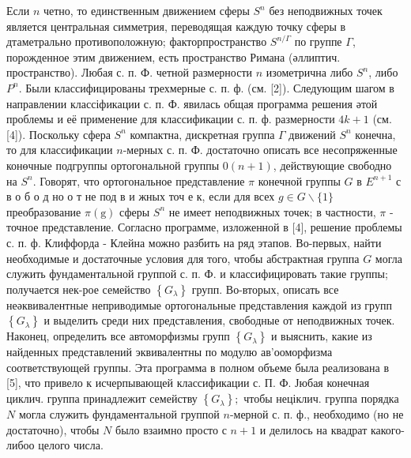 \documentclass[10pt]{article}
\begin{document}
Если $n$ четно, то единственным движением сферы $S^{n}$ без неподвижных точек является центральная симметрия, переводящая каждую точку сферы в дтаметрально противоположную; факторпространство $S^{n / \Gamma}$ по группе $\Gamma$, порожденное этим движением, есть пространство Римана (әллиптич. пространство). Любая с. п. Ф. четной размерности $n$ изометрична либо $S^{n}$, либо $P^{n}$. Были классифицированы трехмерные с. п. ф. (см. [2]). Следующим шагом в направлении классіфикации с. п. Ф. явилась общая программа решения әтой проблемы и её применение для классификации с. п. ф. размерности $4 k+1$ (см. [4]). Поскольку сфера $S^{n}$ компактна, дискретная группа $\Gamma$ движений $S^{n}$ конечна, то для классификации $n$-мерных с. п. Ф. достаточно описать все несопряженные конөчные подгруппы ортогональной группы $0(n+1)$, действующие свободно на $S^{n}$. Говорят, что ортогональное представление $\pi$ конечной группы $G$ в $E^{n+1}$ с в о б о д но о т не под в и жных точ е к, если для всех $g \in G \backslash\{1\}$ преобразование $\pi(\mathrm{g})$ сферы $S^{n}$ не имеет неподвижных точек; в частности, $\pi$ - точное представление. Согласно программе, изложенной в [4], решение проблемы с. п. ф. Клиффорда - Клейна можно разбить на ряд этапов. Во-первых, найти необходимые и достаточные условия для того, чтобы абстрактная группа $G$ могла служить фундаментальной группой с. п. Ф. и классифицировать такие группы; получается нек-рое семейство $\left\{G_{\lambda}\right\}$ групп. Во-вторых, описать все неәквивалентные неприводимые ортогональные представления каждой из групп $\left\{G_{\lambda}\right\}$ и выделить среди них представления, свободные от неподвижных точек. Наконец, определить все автоморфизмы групп $\left\{G_{\lambda}\right\}$ и выяснить, какие из найденных представлений эквивалентны по модулю ав'ооморфизма соответствующей группы. Эта программа в полном объеме была реализована в [5], что привело к исчерпывающей классификации с. П. Ф. Јюбая конечная циклич. группа принадлежит семейству $\left\{G_{\lambda}\right\} ;$ чтобы неціклич. группа порядка $N$ могла служить фундаментальной группой $n$-мерной с. п. ф., необходимо (но не достаточно), чтобы $N$ было взаимно просто с $n+1$ и делилось на квадрат какого-либоо целого числа.
\end{document}
